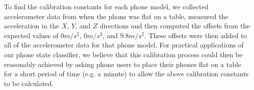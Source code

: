 \begin{center}
 \scalebox{0.375}{}
  \scalebox{0.375}{}
  \scalebox{0.375}{}
  \label{fig:accelGraph}
\end{center}


To find the calibration constants for each phone model, we collected accelerometer
data from when the phone was flat on a table, measured the acceleration in the
$X$, $Y$, and $Z$ directions and then computed the offsets from the expected values of
$0m/s^2$, $0m/s^2$, and $9.8m/s^2$. These offsets were then added to all of the accelerometer data for that phone model.
For practical applications of our phone state classifier, we believe that this calibration process
could then be reasonably achieved by asking phone users to place their phones flat on a table for a short period of time (e.g. a minute)
to allow the above calibration constants to be calculated.


